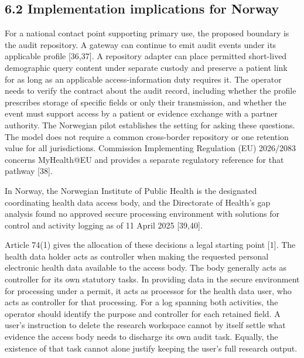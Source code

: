 \documentclass[preprint,review,12pt]{elsarticle}
\begin{document}
\hypertarget{implementation-implications-for-norway}{%
\subsection{6.2 Implementation implications for
Norway}\label{implementation-implications-for-norway}}

For a national contact point supporting primary use, the proposed
boundary is the audit repository. A gateway can continue to emit audit
events under its applicable profile {[}36,37{]}. A repository adapter
can place permitted short-lived demographic query content under separate
custody and preserve a patient link for as long as an applicable
access-information duty requires it. The operator needs to verify the
contract about the audit record, including whether the profile
prescribes storage of specific fields or only their transmission, and
whether the event must support access by a patient or evidence exchange
with a partner authority. The Norwegian pilot establishes the setting
for asking these questions. The model does not require a common
cross-border repository or one retention value for all jurisdictions.
Commission Implementing Regulation (EU) 2026/2083 concerns MyHealth@EU
and provides a separate regulatory reference for that pathway {[}38{]}.

In Norway, the Norwegian Institute of Public Health is the designated
coordinating health data access body, and the Directorate of Health's
gap analysis found no approved secure processing environment with
solutions for control and activity logging as of 11 April 2025
{[}39,40{]}.

Article 74(1) gives the allocation of these decisions a legal starting
point {[}1{]}. The health data holder acts as controller when making the
requested personal electronic health data available to the access body.
The body generally acts as controller for its own statutory tasks. In
providing data in the secure environment for processing under a permit,
it acts as processor for the health data user, who acts as controller
for that processing. For a log spanning both activities, the operator
should identify the purpose and controller for each retained field. A
user's instruction to delete the research workspace cannot by itself
settle what evidence the access body needs to discharge its own audit
task. Equally, the existence of that task cannot alone justify keeping
the user's full research output.
\end{document}

